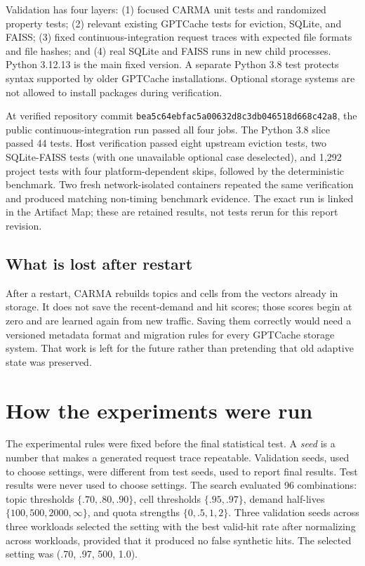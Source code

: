 \documentclass[10pt,letterpaper]{article}
\newcommand{\code}[1]{\texttt{#1}}
\begin{document}
Validation has four layers: (1) focused CARMA unit tests and randomized
property tests; (2) relevant existing GPTCache tests for eviction, SQLite, and
FAISS; (3) fixed continuous-integration request traces with expected file
formats and file hashes; and (4) real SQLite and FAISS runs in new child
processes. Python 3.12.13 is the main fixed version. A separate Python 3.8 test
protects syntax supported by older GPTCache installations. Optional storage
systems are not allowed to install packages during verification.

At verified repository commit \code{bea5c64ebfac5a00632d8c3db046518d668c42a8},
the public continuous-integration run passed all four jobs. The Python 3.8
slice passed 44 tests. Host verification passed eight upstream eviction tests,
two SQLite-FAISS tests (with one unavailable optional case deselected), and
1,292 project tests with four platform-dependent skips, followed by the
deterministic benchmark. Two fresh network-isolated containers repeated the
same verification and produced matching non-timing benchmark evidence. The
exact run is linked in the Artifact Map; these are retained results, not tests
rerun for this report revision.

\subsection{What is lost after restart}

After a restart, CARMA rebuilds topics and cells from the vectors already in
storage. It does not save the recent-demand and hit scores; those scores begin
at zero and are learned again from new traffic. Saving them correctly would
need a versioned metadata format and migration rules for every GPTCache storage
system. That work is left for the future rather than pretending that old
adaptive state was preserved.

\section{How the experiments were run}

The experimental rules were fixed before the final statistical test. A
\emph{seed} is a number that makes a generated request trace repeatable.
Validation seeds, used to choose settings, were different from test seeds,
used to report final results. Test results were never used to choose settings.
The search evaluated 96 combinations: topic thresholds
$\{.70,.80,.90\}$, cell thresholds $\{.95,.97\}$, demand half-lives
$\{100,500,2000,\infty\}$, and quota strengths $\{0,.5,1,2\}$. Three
validation seeds across three workloads selected the setting with the best
valid-hit rate after normalizing across workloads, provided that it produced
no false synthetic hits. The selected setting was (.70, .97, 500, 1.0).
\end{document}
